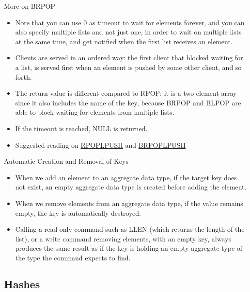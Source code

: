 \documentclass[10pt]{beamer}
\begin{document}
\begin{frame}[fragile]{More on BRPOP}
  \begin{itemize}
    \item Note that you can use 0 as timeout to wait for elements forever, and
    you can also specify multiple lists and not just one, in order to wait on
    multiple lists at the same time, and get notified when the first list
    receives an element.
    \item Clients are served in an ordered way: the first client that blocked
    waiting for a list, is served first when an element is pushed by some other
    client, and so forth.
    \item The return value is different compared to RPOP: it is a two-element
    array since it also includes the name of the key, because BRPOP and BLPOP
    are able to block waiting for elements from multiple lists.
    \item If the timeout is reached, NULL is returned.
    \item Suggested reading on \href{https://redis.io/commands/rpoplpush}{RPOPLPUSH}
    and \href{https://redis.io/commands/brpoplpush}{BRPOPLPUSH}
  \end{itemize}
\end{frame}

\begin{frame}[fragile]{Automatic Creation and Removal of Keys}
  \begin{itemize}
    \item When we add an element to an aggregate data type, if the target key
    does not exist, an empty aggregate data type is created before adding the
    element.
    \item When we remove elements from an aggregate data type, if the value
    remains empty, the key is automatically destroyed.
    \item Calling a read-only command such as LLEN (which returns the length of
    the list), or a write command removing elements, with an empty key, always
    produces the same result as if the key is holding an empty aggregate type
    of the type the command expects to find.
  \end{itemize}
\end{frame}

\subsection{Hashes}
\end{document}
